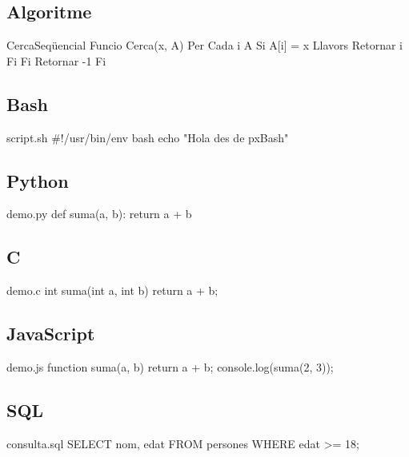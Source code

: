 \documentclass{P3CTeX}
\begin{document}
\subsection*{Algoritme}
\begin{pxCode}[language=algoritme]{CercaSeqüencial}
Funcio Cerca(x, A)
  Per Cada i A
    Si A[i] = x Llavors
      Retornar i
    Fi
  Fi
  Retornar -1
Fi
\end{pxCode}

\subsection*{Bash}
\begin{pxCode}[language=pxBash]{script.sh}
#!/usr/bin/env bash
echo "Hola des de pxBash"
\end{pxCode}

\subsection*{Python}
\begin{pxCode}[language=pxPython]{demo.py}
def suma(a, b):
    return a + b
\end{pxCode}

\subsection*{C}
\begin{pxCode}[language=pxC]{demo.c}
int suma(int a, int b) {
  return a + b;
}
\end{pxCode}

\subsection*{JavaScript}
\begin{pxCode}[language=pxJavaScript]{demo.js}
function suma(a, b) {
  return a + b;
}
console.log(suma(2, 3));
\end{pxCode}

\subsection*{SQL}
\begin{pxCode}[language=pxSQL]{consulta.sql}
SELECT nom, edat
FROM persones
WHERE edat >= 18;
\end{pxCode}
\end{document}
